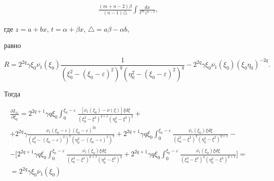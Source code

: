 \begin{pf}
\begin{align*}
\frac{(m+n-2)\beta}{(n-1)\triangle}\int \frac{dx}{t^mz^{n-1}},


\end{align*}


где $z=a+bx$, $t=\alpha+\beta x$, $\triangle=a\beta-\alpha b$,


равно


$$


R=2^{2q}\gamma \xi_0\overline{\nu_1}(\xi_0)\frac{1}


{(\xi_0^2-(\xi_0-\varepsilon)^2)^q (\eta_0^2-(\xi_0-\varepsilon)^2)^q}-


2^{2q}\gamma \xi_0\overline{\nu_1}(\xi_0) (\xi_0\eta_0)^{-2q}.


$$


Тогда


\begin{multline*}


\frac{\partial I_{1\varepsilon}}{\partial \xi_0}= 


2^{2q+1}\gamma q\xi_0\int_0^{\xi_0-\varepsilon } 


\frac{\left[\overline{\nu_1}(\xi_0)-\overline{\nu}(\xi)\right] \xi d\xi}


{(\xi_0^2-\xi^2)^{q+1}(\eta_0^2-\xi^2)^q}+\\


%


+2^{2q}\gamma \frac{\nu_1(\xi_0-\varepsilon)(\xi_0-\varepsilon)^{2q}}


{(\xi_0^2-(\xi_0-\varepsilon)^2)^q(\eta_0^2-(\xi_0-\varepsilon)^2)^q}+


2^{2q+1}\gamma q\xi_0\int_0^{\xi_0-\varepsilon } 


\frac{\overline{\nu_1}(\xi_0)\xi d\xi }


{(\xi_0^2-\xi^2)^q (\eta_0^2-\xi^2)^{q+1}}- \\


%


-\bigg[2^{2q+1}\gamma q\xi_0\int_0^{\xi_0-\varepsilon } 


\frac{\overline{\nu_1}(\xi_0) \xi d\xi}


{(\xi_0^2-\xi^2)^{q+1}(\eta_0^2-\xi^2)^q}+


2^{2q+1}\gamma q\xi_0\int_0^{\xi_0-\varepsilon } 


\frac{\overline{\nu_1}(\xi_0) \xi d\xi}


{(\xi_0^2-\xi^2)^q (\eta_0^2-\xi^2)^{q+1}}\bigg]= \\


%


= 2^{2q}\gamma\xi_0\overline \nu_1(\xi_0)



\end{multline*}
\end{pf}
